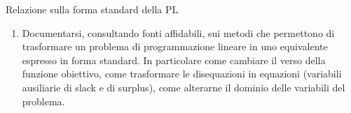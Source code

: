 \documentclass{beamer}
\begin{document}
\generatitolo

\begin{frame}{Relazione sulla forma standard della PL}
    \begin{enumerate}    
     \item Documentarsi, consultando fonti affidabili, sui metodi che permettono di trasformare
     un problema di programmazione lineare in uno equivalente espresso in
     forma standard.
     In particolare come cambiare il verso della funzione obiettivo,
     come trasformare le disequazioni in equazioni (variabili ausiliarie di slack e di surplus), come alterarne il dominio delle variabili del
     problema.
     
    \end{enumerate}
\end{frame}
\end{document}
